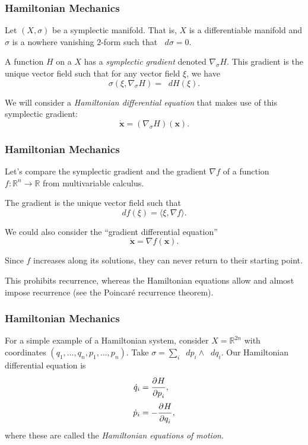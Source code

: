 \documentclass{beamer}
\newcommand{\R}{\mathbb{R}}
\newcommand{\bp}[1]{\bm{#1}}
\newcommand{\bd}[1]{\bm{\dot{#1}}}
\newcommand{\sgrad}{\nabla_{\sigma}}
\newcommand{\dif}{\mathop{}\!{d}}
\newcommand\pd[3][]{\frac{\strut\partial^{#1}#2}{\strut\partial#3^{#1}}}
\begin{document}
\begin{frame}
  \frametitle{Hamiltonian Mechanics}
  Let $(X, \sigma)$ be a symplectic manifold.
  That is, $X$ is a differentiable manifold and $\sigma$ is a nowhere vanishing
  $2$-form such that $\dif \sigma = 0$.

  A function $H$ on a $X$ has a \emph{symplectic gradient} denoted $\sgrad H$.
  This gradient is the unique vector field such that for any vector field $\xi$,
  we have
  \begin{equation*}
    \sigma(\xi, \sgrad H) = \dif H(\xi).
  \end{equation*}

  We will consider a \emph{Hamiltonian differential equation} that makes use of
  this symplectic gradient:
  \begin{equation*}
    \bd{x} = (\sgrad H)(\bp{x}).
  \end{equation*}
\end{frame}

\begin{frame}
  \frametitle{Hamiltonian Mechanics}
  Let's compare the symplectic gradient and the gradient $\nabla f$ of a function
  $f : \R^n \to \R$ from multivariable calculus.

  The gradient is the unique vector field such that
  \begin{equation*}
    df(\xi) = \langle \xi, \nabla f \rangle.
  \end{equation*}

  We could also consider the ``gradient differential equation''
  \begin{equation*}
    \bd{x} = \nabla f(\bp{x}).
  \end{equation*}

  Since $f$ increases along its solutions, they can never return to their
  starting point.

  This prohibits recurrence, whereas the Hamiltonian equations allow and almost
  impose recurrence (see the Poincar{\'e} recurrence theorem).
\end{frame}

\begin{frame}
  \frametitle{Hamiltonian Mechanics}
  For a simple example of a Hamiltonian system, consider $X = \R^{2n}$
  with coordinates $(q_1, \ldots, q_n, p_1, \ldots, p_n)$.
  Take $\sigma = \sum_i \dif p_i \wedge \dif q_i$.
  Our Hamiltonian differential equation is
  \begin{align*}
    \dot{q}_i &= \pd{H}{p_i},\\
    \dot{p}_i &= -\pd{H}{q_i},
  \end{align*}
  where these are called the \emph{Hamiltonian equations of motion}.
\end{frame}
\end{document}
